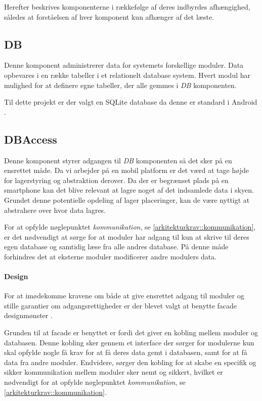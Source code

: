 Herefter beskrives komponenterne i rækkefølge af deres indbyrdes afhængighed, således at forståelsen af hver komponent kun afhænger af det læste.

\subsection{DB}
Denne komponent administrerer data for systemets forskellige moduler.
Data opbevares i en række tabeller i et relationelt database system.
Hvert modul har mulighed for at definere egne tabeller, der alle gemmes i \textit{DB} komponenten.

Til dette projekt er der valgt en SQLite database da denne er standard i Android \citep{android_database}.


\subsection{DBAccess}\label{subsec:DBACCESS}
Denne komponent styrer adgangen til \textit{DB} komponenten så det sker på en ensrettet måde.
Da vi arbejder på en mobil platform er det værd at tage højde for lagerstyring og abstraktion derover.
Da der er begrænset plads på en smartphone kan det blive relevant at lagre noget af det indsamlede data i skyen.
Grundet denne potentielle opdeling af lager placeringer, kan de være nyttigt at abstrahere over hvor data lagres.

For at opfylde nøglepunktet \textit{kommunikation}, se \cref{arkitekturkrav::kommunikation}, er det nødvendigt at sørge for at moduler har adgang til kun at skrive til deres egen database og samtidig læse fra alle andres database.
På denne måde forhindres det at eksterne moduler modificerer andre modulers data.

\paragraph{Design} 
For at imødekomme kravene om både at give ensrettet adgang til moduler og stille garantier om adgangsrettigheder er der blevet valgt at benytte facade designmønster \citep[s.~185]{gamma1994design}.

Grunden til at facade er benyttet er fordi det giver en kobling mellem moduler og databasen.
Denne kobling sker gennem et interface der sørger for modulerne kun skal opfylde nogle få krav for at få deres data gemt i databasen, samt for at få data fra andre moduler.
Endvidere, sørger den kobling for at skabe en specifik og sikker kommunikation mellem moduler sker nemt og sikkert, hvilket er nødvendigt for at opfylde nøglepunktet \textit{kommunikation}, se \cref{arkitekturkrav::kommunikation}.

